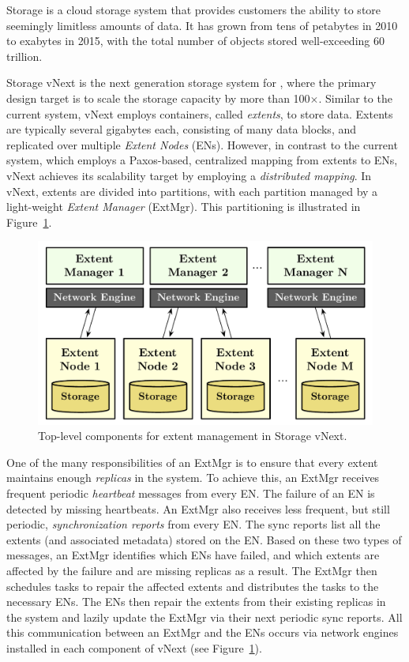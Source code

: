 \Microsoft \Azure Storage is a cloud storage system that provides customers the ability to store seemingly limitless amounts of data. It has grown from tens of petabytes in 2010 to exabytes in 2015, with the total number of objects stored well-exceeding 60 trillion.

\Azure Storage vNext is the next generation storage system for \Microsoft \Azure, where the primary design target is to scale the storage capacity by more than 100$\times$. Similar to the current system, vNext employs containers, called \emph{extents}, to store data. Extents are typically several gigabytes each, consisting of many data blocks, and replicated over multiple \emph{Extent Nodes} (ENs). However, in contrast to the current system, which employs a Paxos-based, centralized mapping from extents to ENs, vNext achieves its scalability target by employing a \emph{distributed mapping}. In vNext, extents are divided into partitions, with each partition managed by a light-weight \emph{Extent Manager} (ExtMgr). This partitioning is illustrated in Figure~\ref{fig:vnext}.

\begin{figure}[t]
\centering
\includegraphics[width=\linewidth]{img/azurestore}
\caption{Top-level components for extent management in \Microsoft \Azure Storage vNext.}
\label{fig:vnext}
\end{figure}

One of the many responsibilities of an ExtMgr is to ensure that every extent maintains enough \emph{replicas} in the system. To achieve this, an ExtMgr receives frequent periodic \emph{heartbeat} messages from every EN. The failure of an EN is detected by missing heartbeats. An ExtMgr also receives less frequent, but still periodic, \emph{synchronization reports} from every EN. The sync reports list all the extents (and associated metadata) stored on the EN. Based on these two types of messages, an ExtMgr identifies which ENs have failed, and which extents are affected by the failure and are missing replicas as a result. The ExtMgr then schedules tasks to repair the affected extents and distributes the tasks to the necessary ENs. The ENs then repair the extents from their existing replicas in the system and lazily update the ExtMgr via their next periodic sync reports. All this communication between an ExtMgr and the ENs occurs via network engines installed in each component of vNext (see Figure~\ref{fig:vnext}).

